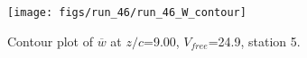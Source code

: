 \begin{figure}[H]
\centering
\texttt{[image: figs/run\_46/run\_46\_W\_contour]}
\caption{Contour plot of $\overline{w}$ at $z/c$=9.00, $V_{free}$=24.9, station 5.}
\end{figure}


